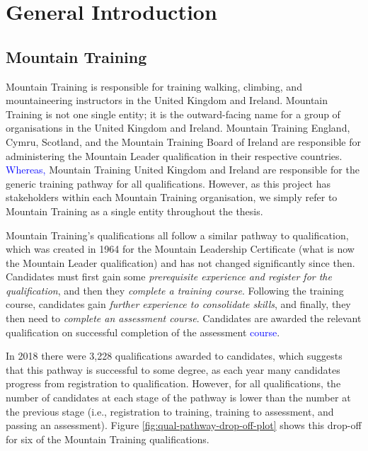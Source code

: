 \documentclass[
  12pt,
  a4paper,
]{book}
\begin{document}
\hypertarget{gen-intro}{%
\chapter{General Introduction}\label{gen-intro}}

\hypertarget{mountain-training}{%
\section{Mountain Training}\label{mountain-training}}

Mountain Training is responsible for training walking, climbing, and mountaineering instructors in the United Kingdom and Ireland. Mountain Training is not one single entity; it is the outward-facing name for a group of organisations in the United Kingdom and Ireland. Mountain Training England, Cymru, Scotland, and the Mountain Training Board of Ireland are responsible for administering the Mountain Leader qualification in their respective countries. \textcolor{blue}{Whereas,} Mountain Training United Kingdom and Ireland are responsible for the generic training pathway for all qualifications. However, as this project has stakeholders within each Mountain Training organisation, we simply refer to Mountain Training as a single entity throughout the thesis.

Mountain Training's qualifications all follow a similar pathway to qualification, which was created in 1964 for the Mountain Leadership Certificate (what is now the Mountain Leader qualification) and has not changed significantly since then. Candidates must first gain some \emph{prerequisite experience and register for the qualification}, and then they \emph{complete a training course}. Following the training course, candidates gain \emph{further experience to consolidate skills}, and finally, they then need to \emph{complete an assessment course}. Candidates are awarded the relevant qualification on successful completion of the assessment \textcolor{blue}{course}.

In 2018 there were 3,228 qualifications awarded to candidates, which suggests that this pathway is successful to some degree, as each year many candidates progress from registration to qualification. However, for all qualifications, the number of candidates at each stage of the pathway is lower than the number at the previous stage (i.e., registration to training, training to assessment, and passing an assessment). Figure \ref{fig:qual-pathway-drop-off-plot} shows this drop-off for six of the Mountain Training qualifications.
\end{document}
